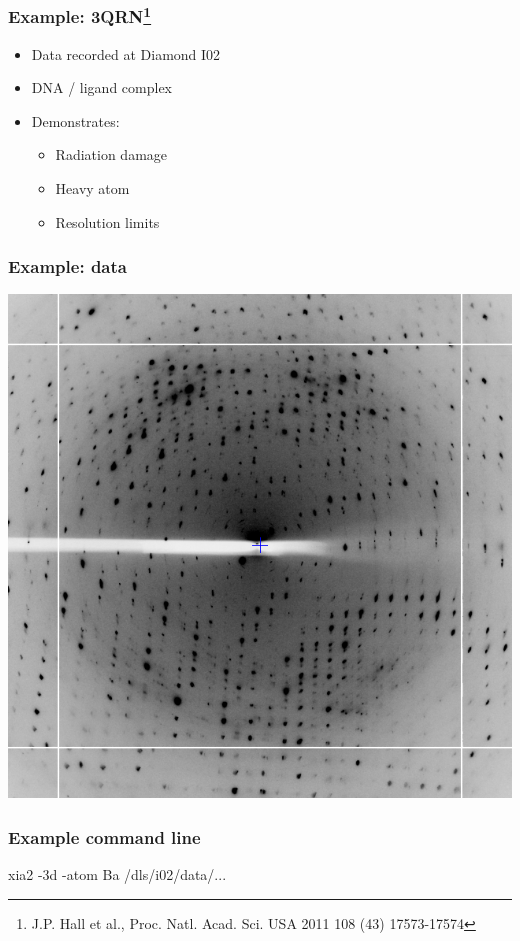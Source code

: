 \documentclass[slides,compress]{beamer}
\begin{document}
\begin{frame}
\frametitle{Example: 3QRN\footnote{J.P. Hall et al., Proc. Natl. Acad. Sci. USA 2011 108 (43) 17573-17574}}
\begin{itemize}
\item{Data recorded at Diamond I02}
\item{DNA / ligand complex}
\item{Demonstrates:
\begin{itemize}
\item{Radiation damage}
\item{Heavy atom}
\item{Resolution limits}
\end{itemize}
}
\end{itemize}
\end{frame}

\begin{frame}
\frametitle{Example: data}
\begin{center}
\includegraphics[scale=0.35]{figures/3qrn-diffraction.png}
\end{center}
\end{frame}

\begin{frame}
\frametitle{Example command line}
{ \huge
xia2 -3d -atom Ba /dls/i02/data/...
}
\end{frame}
\end{document}
